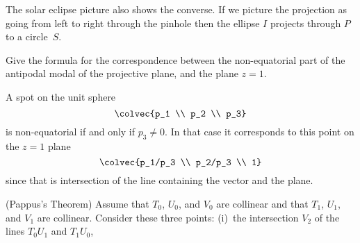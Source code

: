 \begin{exercises}
\begin{answer}
      The solar eclipse picture also shows the converse. 
      If we picture the projection as going from left to right 
      through the pinhole
      then the ellipse $I$ projects through $P$ to a circle~$S$.
    \end{answer}
  \item \label{exer:CorrProjPlaneEucPl} 
    Give the formula for the correspondence between the 
    non-equatorial part of the antipodal modal
    of the projective plane, and the plane $z=1$.
    \begin{answer}
      A spot on the unit sphere
      \begin{equation*}
        \colvec{p_1 \\ p_2 \\ p_3} 
      \end{equation*}
      is non-equatorial if and only if $p_3\neq 0$.
      In that case it corresponds to this point on the $z=1$ plane
      \begin{equation*}
        \colvec{p_1/p_3 \\ p_2/p_3  \\ 1}
      \end{equation*}
      since that is intersection of the line containing the vector and the
      plane. 
    \end{answer}
  \item 
    (Pappus's Theorem)
    Assume that $T_0$, $U_0$, and  $V_0$ are collinear and that 
    $T_1$, $U_1$, and $V_1$ are collinear. 
    Consider these three points:
    (i)~the intersection $V_2$ of the lines $T_0U_1$ and $T_1U_0$,

\end{exercises}
